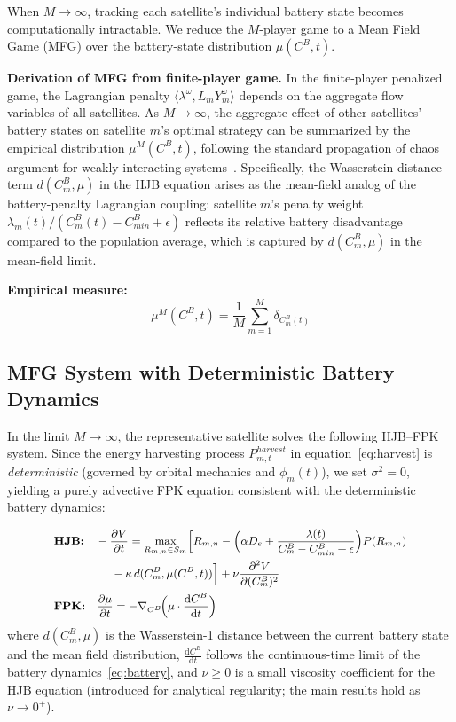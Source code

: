 \documentclass[journal]{IEEEtran}
\newcommand{\CB}{C^{B}}
\newcommand{\CBmin}{C^{B}_{min}}
\begin{document}
When $M\to\infty$, tracking each satellite's individual battery state becomes computationally intractable. We reduce the $M$-player game to a Mean Field Game (MFG) over the battery-state distribution $\mu(\CB,t)$.

\textbf{Derivation of MFG from finite-player game.}
In the finite-player penalized game, the Lagrangian penalty $\langle\lambda^\omega, L_m Y_m^\omega\rangle$ depends on the aggregate flow variables of all satellites. As $M\to\infty$, the aggregate effect of other satellites' battery states on satellite $m$'s optimal strategy can be summarized by the empirical distribution $\mu^M(\CB,t)$, following the standard propagation of chaos argument for weakly interacting systems~\cite{lasry2007mfg}. Specifically, the Wasserstein-distance term $d(\CB_m, \mu)$ in the HJB equation arises as the mean-field analog of the battery-penalty Lagrangian coupling: satellite $m$'s penalty weight $\lambda_m(t)/(\CB_m(t)-\CBmin+\epsilon)$ reflects its relative battery disadvantage compared to the population average, which is captured by $d(\CB_m, \mu)$ in the mean-field limit.

\textbf{Empirical measure:}
\begin{equation}
    \mu^M(\CB,t) = \frac{1}{M}
    \sum_{m=1}^{M}\delta_{\CB_m(t)}
    \label{eq:emp_measure}
\end{equation}

\subsection{MFG System with Deterministic Battery
Dynamics}

In the limit $M\to\infty$, the representative satellite solves the following HJB--FPK system. Since the energy harvesting process $P_{m,t}^{harvest}$ in equation~\eqref{eq:harvest} is \emph{deterministic} (governed by orbital mechanics and $\phi_m(t)$), we set $\sigma^2=0$, yielding a purely advective FPK equation consistent with the deterministic battery dynamics:

\begin{subequations}
\label{eq:mfg_system}
\small
\begin{align}
    &\textbf{HJB:}\quad
    -\frac{\partial V}{\partial t}
    = \max_{R_{m,n}\in S_m}
    \Bigl[R_{m,n}
    - \Bigl(\alpha D_e
    + \frac{\lambda(t)}{\CB_m-\CBmin+\epsilon}
    \Bigr)P(R_{m,n})
    \notag\\
    &\qquad\qquad\quad
    - \kappa\,d(\CB_m,\mu(\CB,t))
    \Bigr]
    + \nu\frac{\partial^2 V}{\partial (\CB_m)^2}
    \label{eq:hjb}\\
    &\textbf{FPK:}\quad
    \frac{\partial\mu}{\partial t}
    = -\nabla_{\CB}\!\Bigl(\mu\cdot
    \frac{\mathrm{d}\CB}{\mathrm{d}t}\Bigr)
    \label{eq:fpk}
\end{align}
\end{subequations}
where $d(\CB_m,\mu)$ is the Wasserstein-1 distance between the current battery state and the mean field distribution, $\frac{\mathrm{d}\CB}{\mathrm{d}t}$ follows the continuous-time limit of the battery dynamics~\eqref{eq:battery}, and $\nu\geq 0$ is a small viscosity coefficient for the HJB equation (introduced for analytical regularity; the main results hold as $\nu\to 0^+$).
\end{document}

